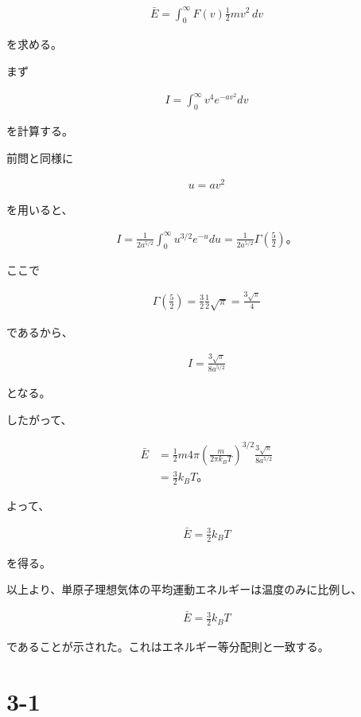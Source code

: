 \documentclass[platex,dvipdfmx,a4paper]{jsarticle}
\begin{document}
\begin{align*}
\bar E
=
\int_0^\infty
F(v)\frac12 mv^2\,dv
\end{align*}

を求める。

まず

\begin{align*}
I
=
\int_0^\infty
v^4e^{-av^2}dv
\end{align*}

を計算する。

前問と同様に

\begin{align*}
u=av^2
\end{align*}

を用いると、

\begin{align*}
I
=
\frac1{2a^{5/2}}
\int_0^\infty
u^{3/2}e^{-u}du
=
\frac1{2a^{5/2}}
\Gamma\left(\frac52\right)。
\end{align*}

ここで

\begin{align*}
\Gamma\left(\frac52\right)
=
\frac32\frac12\sqrt{\pi}
=
\frac{3\sqrt{\pi}}4
\end{align*}

であるから、

\begin{align*}
I
=
\frac{3\sqrt{\pi}}
{8a^{5/2}}
\end{align*}

となる。

したがって、

\begin{align*}
\bar E
&=
\frac12m
4\pi
\left(
\frac{m}{2\pi k_BT}
\right)^{3/2}
\frac{3\sqrt{\pi}}
{8a^{5/2}} \\
&=
\frac32k_BT。
\end{align*}

よって、

\begin{align*}
\bar E
=
\frac32k_BT
\end{align*}

を得る。

以上より、単原子理想気体の平均運動エネルギーは温度のみに比例し、

\begin{align*}
\bar E
=
\frac32k_BT
\end{align*}

であることが示された。これはエネルギー等分配則と一致する。
\section{3-1}
\end{document}
